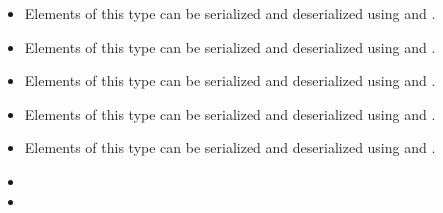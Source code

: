\begin{itemize}
\item {}
Elements of this type can be serialized and deserialized using
{}
and {}.
\item {}
Elements of this type can be serialized and deserialized using
{}
and
{}.
\item {}
Elements of this type can be serialized and deserialized using
{}
and
{}.
\item {}
Elements of this type can be serialized and deserialized using
{}
and
{}.
\item {}
Elements of this type can be serialized and deserialized using
{}
and
{}.
\end{itemize}

\begin{itemize}
\item {}
\item {}
\end{itemize}

{}

